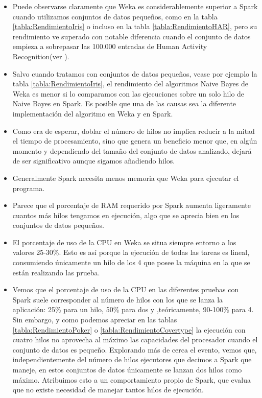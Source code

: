 \begin{itemize}
	\item Puede observarse claramente que Weka es considerablemente superior a Spark cuando utilizamos conjuntos de datos pequeños, como en la tabla \ref{tabla:RendimientoIris} o incluso en la tabla \ref{tabla:RendimientoHAR}, pero su rendimiento ve superado con notable diferencia cuando el conjunto de datos empieza a sobrepasar las 100.000 entradas de Human Activity Recognition(ver ).
	\item Salvo cuando tratamos con conjuntos de datos pequeños, vease por ejemplo la tabla \ref{tabla:RendimientoIris}, el rendimiento del algoritmos Naive Bayes de Weka es menor si lo comparamos con las ejecuciones sobre un solo hilo de Naive Bayes en Spark. Es posible que una de las causas sea la diferente implementación del algoritmo en Weka y en Spark.
	\item Como era de esperar, doblar el número de hilos no implica reducir a la mitad el tiempo de procesamiento, sino que genera un beneficio menor que, en algún momento y dependiendo del tamaño del conjunto de datos analizado, dejará de ser significativo aunque sigamos añadiendo hilos.
	\item Generalmente Spark necesita menos memoria que Weka para ejecutar el programa.
	\item Parece que el porcentaje de RAM requerido por Spark aumenta ligeramente cuantos más hilos tengamos en ejecución, algo que se aprecia bien en los conjuntos de datos pequeños.
	\item El porcentaje de uso de la CPU en Weka se situa siempre entorno a los valores 25-30\%. Esto es así porque la ejecución de todas las tareas es lineal, consumiendo únicamente un hilo de los 4 que posee la máquina en la que se están realizando las prueba.
	\item Vemos que el porcentaje de uso de la CPU en las diferentes pruebas con Spark suele corresponder al número de hilos con los que se lanza la aplicación: 25\% para un hilo, 50\% para dos y ,teóricamente, 90-100\% para 4. Sin embargo, y como podemos apreciar en las tablas \ref{tabla:RendimientoPoker} o \ref{tabla:RendimientoCovertype} la ejecución con cuatro hilos no aprovecha al máximo las capacidades del procesador cuando el conjunto de datos es pequeño. Explorando más de cerca el evento, vemos que, independientemente del número de hilos ejecutores que decimos a Spark que maneje, en estos conjuntos de datos únicamente se lanzan dos hilos como máximo. Atribuimos esto a un comportamiento propio de Spark, que evalua que no existe necesidad de manejar tantos hilos de ejecución. 
\end{itemize}
